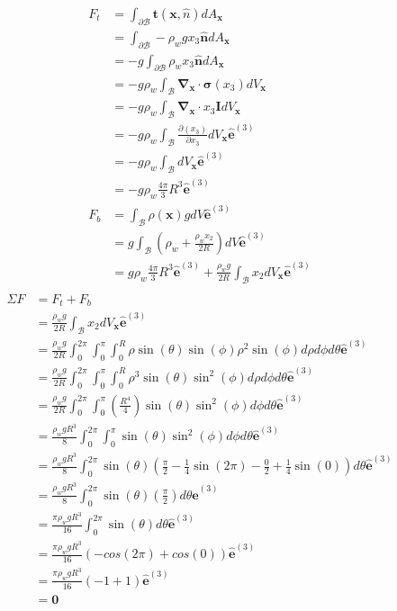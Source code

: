 \begin{align*}
    F_t &= \int_{\partial \mathcal{B}} \mathbf{t}(\mathbf{x},\hat n)dA_\mathbf{x} \\
    &= \int_{\partial \mathcal{B}}-\rho_wgx_3\mathbf{\hat n}dA_\mathbf{x} \\
    &= -g\int_{\partial \mathcal{B}}\rho_wx_3\mathbf{\hat n}dA_\mathbf{x} \\
    &= -g\rho_w\int_\mathcal{B} \mathbf{\nabla}_\mathbf{x} \cdot \mathbf{\sigma}(x_3)dV_\mathbf{x} \\
    &= -g\rho_w\int_\mathcal{B} \mathbf{\nabla}_\mathbf{x} \cdot x_3 \mathbf{I} dV_\mathbf{x} \\
    &= -g\rho_w\int_\mathcal{B} \frac{\partial(x_3)}{\partial x_3} dV_\mathbf{x} \mathbf{\hat e}^{(3)}\\
    &= -g\rho_w \int_\mathcal{B}dV_\mathbf{x} \mathbf{\hat e}^{(3)}\\
    &= -g\rho_w \frac{4\pi}{3}R^3 \mathbf{\hat e}^{(3)}\\
    F_b &= \int_\mathcal{B}\rho(\mathbf{x}) g dV \mathbf{\hat e}^{(3)} \\
    &= g \int_\mathcal{B}\left(\rho_w + \frac{\rho_w x_2}{2R}\right) dV \mathbf{\hat e}^{(3)}\\
    &= g\rho_w\frac{4\pi}{3}R^3\mathbf{\hat e}^{(3)} + \frac{\rho_w g}{2R}\int_\mathcal{B}x_2dV_\mathbf{x} \mathbf{\hat e}^{(3)} \\
\end{align*}
\begin{align*}
    \Sigma F &= F_t + F_b \\
    &= \frac{\rho_w g}{2R}\int_\mathcal{B}x_2dV_\mathbf{x} \mathbf{\hat e}^{(3)} \\
    &= \frac{\rho_wg}{2R}\int_0^{2\pi} \int_0^\pi \int_0^R \rho\sin(\theta)\sin(\phi) \rho^2\sin(\phi)d\rho d\phi d\theta \mathbf{\hat e}^{(3)}\\
    &= \frac{\rho_wg}{2R}\int_0^{2\pi} \int_0^\pi \int_0^R \rho^3\sin(\theta)\sin^2(\phi)d\rho d\phi d\theta \mathbf{\hat e}^{(3)}\\ 
    &= \frac{\rho_wg}{2R}\int_0^{2\pi} \int_0^\pi \left(\frac{R^4}{4}\right)\sin(\theta)\sin^2(\phi)d\phi d\theta \mathbf{\hat e}^{(3)}\\ 
    &= \frac{\rho_wgR^3}{8}\int_0^{2\pi} \int_0^\pi \sin(\theta)\sin^2(\phi)d\phi d\theta \mathbf{\hat e}^{(3)}\\ 
    &= \frac{\rho_wgR^3}{8}\int_0^{2\pi} \sin(\theta)\left(\frac{\pi}{2}-\frac{1}{4}\sin(2\pi) - \frac{0}{2} + \frac{1}{4}\sin(0)\right) d\theta \mathbf{\hat e}^{(3)}\\ 
    &= \frac{\rho_wgR^3}{8}\int_0^{2\pi} \sin(\theta)\left(\frac{\pi}{2}\right) d\theta \mathbf{\hat e}^{(3)}\\
     &= \frac{\pi \rho_wgR^3}{16}\int_0^{2\pi} \sin(\theta) d\theta \mathbf{\hat e}^{(3)}\\ 
     &= \frac{\pi \rho_wgR^3}{16}(-cos(2\pi) + cos(0)) \mathbf{\hat e}^{(3)}\\
     &= \frac{\pi \rho_wgR^3}{16}(-1 + 1) \mathbf{\hat e}^{(3)}\\
      &= \mathbf{0} \\
\end{align*}

